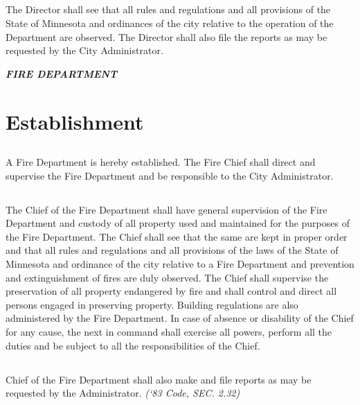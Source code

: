 \subsection{}
The Director shall see that all rules and regulations and all provisions of the State of Minnesota and ordinances of the city relative to the operation of the Department are observed.  The Director shall also file the reports as may be requested by the City Administrator.\newline

\centerline{\textbf{\emph{\LARGE{FIRE DEPARTMENT}}}}
\setcounter{section}{39}
\section{Establishment}
\subsection{}
A Fire Department is hereby established.  The Fire Chief shall direct and supervise the Fire Department and be responsible to the City Administrator.
\subsection{}
The Chief of the Fire Department shall have general supervision of the Fire Department and custody of all property used and maintained for the purposes of the Fire Department.  The Chief shall see that the same are kept in proper order and that all rules and regulations and all provisions of the laws of the State of Minnesota and ordinance of the city relative to a Fire Department and prevention and extinguishment of fires are duly observed.  The Chief shall supervise the preservation of all property endangered by fire and shall control and direct all persons engaged in preserving property.  Building regulations are also administered by the Fire Department. In case of absence or disability of the Chief for any cause, the next in command shall exercise all powers, perform all the duties and be subject to all the responsibilities of the Chief.
\subsection{}
Chief of the Fire Department shall also make and file reports as may be requested by the Administrator.\newline
\emph{(‘83 Code, SEC. 2.32)}
